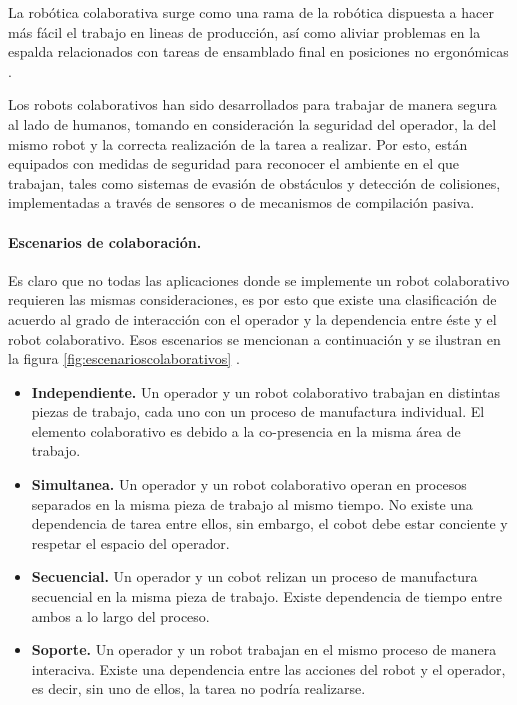 La robótica colaborativa surge como una rama de la robótica dispuesta a hacer más fácil el trabajo en lineas de producción, así como aliviar problemas en la espalda relacionados con tareas de ensamblado final en posiciones no ergonómicas \cite{cobot2018}\cite{cobotreview}.

Los robots colaborativos han sido desarrollados para trabajar de manera segura al lado de humanos, tomando en consideración la seguridad del operador, la del mismo robot y la correcta realización de la tarea a realizar.  Por esto, están equipados con medidas de seguridad para reconocer el ambiente en el que trabajan, tales como sistemas de evasión de obstáculos y detección de colisiones, implementadas a través de sensores o de mecanismos de compilación pasiva.

\paragraph{Escenarios de colaboración.} Es claro que no todas las aplicaciones donde se implemente un robot colaborativo requieren las mismas consideraciones, es por esto que existe una clasificación de acuerdo al grado de interacción con el operador y la dependencia entre éste y el robot colaborativo. Esos escenarios se mencionan a continuación y se ilustran en la figura \ref{fig:escenarioscolaborativos} \cite{Zaatari2019}.


\begin{itemize}
\itemsep0em
\item \textbf{Independiente.} Un operador y un robot colaborativo trabajan en distintas piezas de trabajo, cada uno con un proceso de manufactura individual. El elemento colaborativo es debido a la co-presencia en la misma área de trabajo.
\item \textbf{Simultanea.} Un operador y un robot colaborativo operan en procesos separados en la misma pieza de trabajo al mismo tiempo. No existe una dependencia de tarea entre ellos, sin embargo, el cobot debe estar conciente y respetar el espacio del operador.
\item \textbf{Secuencial.} Un operador y un cobot relizan un proceso de manufactura secuencial en la misma pieza de trabajo. Existe dependencia de tiempo entre ambos a lo largo del proceso.
\item \textbf{Soporte.} Un operador y un robot trabajan en el mismo proceso de manera interaciva. Existe una dependencia entre las acciones del robot y el operador, es decir, sin uno de ellos, la tarea no podría realizarse.
\end{itemize}

